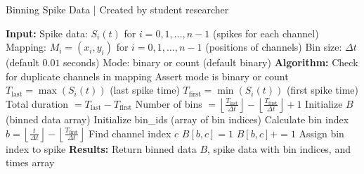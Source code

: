 \documentclass{article} %
\begin{document}
\begin{singlespace}
    \begin{algorithm}
    \caption{Binning Spike Data | Created by student researcher}
        \begin{algorithmic}[1]
            \State \textbf{Input:}
            \State  Spike data: $S_{i}(t)$ for $i = 0, 1, \ldots, n-1$ (spikes for each channel)
            \State  Mapping: $M_{i} = (x_{i}, y_{i})$ for $i = 0, 1, \ldots, n-1$ (positions of channels)
            \State  Bin size: $\Delta t$ (default $0.01$ seconds)
            \State  Mode: binary or count (default binary)
            \State
            \State \textbf{Algorithm:}
            \State  Check for duplicate channels in mapping
            \State  Assert mode is binary or count
            \State  $T_{\text{last}} = \max(S_{i}(t))$ (last spike time)
            \State  $T_{\text{first}} = \min(S_{i}(t))$ (first spike time)
            \State  Total duration $= T_{\text{last}} - T_{\text{first}}$
            \State  Number of bins $= \left\lfloor \frac{T_{\text{last}}}{\Delta t} \right\rfloor - \left\lfloor \frac{T_{\text{first}}}{\Delta t} \right\rfloor + 1$
            \State  Initialize $B$ (binned data array)
            \State  Initialize bin\_ids (array of bin indices)
                \State Calculate bin index $b = \left\lfloor \frac{t}{\Delta t} \right\rfloor - \left\lfloor \frac{T_{\text{first}}}{\Delta t} \right\rfloor$
                    \State Find channel index $c$
                        \State $B[b, c] = 1$
                        \State $B[b, c] += 1$
                    \EndIf
                \EndIf
                \State Assign bin index to spike
            \EndFor
            \State
            \State \textbf{Results:}
            \State  Return binned data $B$, spike data with bin indices, and times array
        \end{algorithmic}
    \end{algorithm}
\end{singlespace}
\end{document}
